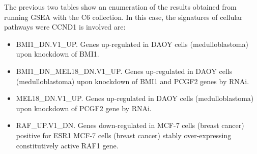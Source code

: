 \begin{table}[h!]
    \caption{Up-regulated gene sets for the C6 collection.}
    \label{detailed_pos_c6}
    \end{table}

The previous two tables show an enumeration of the results obtained from running GSEA with the C6 collection.
In this case, the signatures of cellular pathways were CCND1 is involved are:

\begin{itemize}
    \item BMI1\_DN.V1\_UP. Genes up-regulated in DAOY cells (medulloblastoma) upon knockdown of BMI1.
    \item BMI1\_DN\_MEL18\_DN.V1\_UP. Genes up-regulated in DAOY cells (medulloblastoma) upon knockdown of BMI1 and PCGF2 genes by RNAi.
    \item MEL18\_DN.V1\_UP. Genes up-regulated in DAOY cells (medulloblastoma) upon knockdown of PCGF2 gene by RNAi.
    \item RAF\_UP.V1\_DN. Genes down-regulated in MCF-7 cells (breast cancer) positive for ESR1 MCF-7 cells (breast cancer) stably over-expressing constitutively active RAF1 gene.
\end{itemize}


